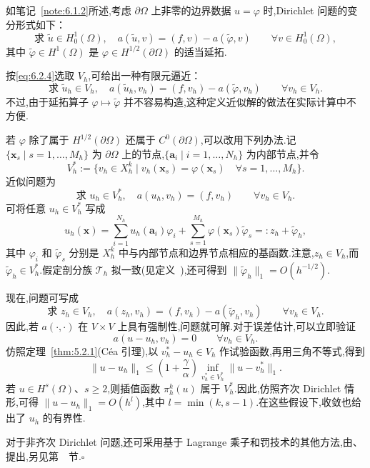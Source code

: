 \begin{note}
如笔记~\ref{note:6.1.2}所述,考虑 \(\partial\Omega\) 上非零的边界数据 \(u=\varphi\) 时,Dirichlet 问题的变分形式如下：
\[
  \text{求 }\widetilde u\in H_0^1(\Omega),\quad
  a(\widetilde u,v)=(f,v)-a(\widetilde\varphi,v)
  \qquad\forall v\in H_0^1(\Omega),
\]
其中 \(\widetilde\varphi\in H^1(\Omega)\) 是 \(\varphi\in H^{1/2}(\partial\Omega)\) 的适当延拓.

按\eqref{eq:6.2.4}选取 \(V_h\),可给出一种有限元逼近：
\[
  \text{求 }\widetilde u_h\in V_h,\quad
  a(\widetilde u_h,v_h)=(f,v_h)-a(\widetilde\varphi,v_h)\qquad\forall v_h\in V_h.
\]
不过,由于延拓算子 \(\varphi\mapsto\widetilde\varphi\) 并不容易构造,这种定义近似解的做法在实际计算中不方便.

若 \(\varphi\) 除了属于 \(H^{1/2}(\partial\Omega)\) 还属于 \(C^0(\partial\Omega)\),可以改用下列办法.记 \(\{\boldsymbol{x}_s\mid s=1,\ldots,M_h\}\) 为 \(\partial\Omega\) 上的节点,\(\{\boldsymbol{a}_i\mid i=1,\ldots,N_h\}\) 为内部节点,并令
\[
  V_h^*:=\{v_h\in X_h^k\mid v_h(\boldsymbol{x}_s)=\varphi(\boldsymbol{x}_s)
                        \quad\forall s=1,\ldots,M_h\}.
\]
近似问题为
\[
  \text{求 }u_h\in V_h^*,\quad a(u_h,v_h)=(f,v_h)\qquad\forall v_h\in V_h.
\]
可将任意 \(u_h\in V_h^*\) 写成
\[
  u_h(\boldsymbol{x})
    =\sum_{i=1}^{N_h}u_h(\boldsymbol{a}_i)\varphi_i
     +\sum_{s=1}^{M_h}\varphi(\boldsymbol{x}_s)\widetilde\varphi_s
    =:z_h+\widetilde\varphi_h,
\]
其中 \(\varphi_i\) 和 \(\widetilde\varphi_s\) 分别是 \(X_h^k\) 中与内部节点和边界节点相应的基函数.注意,\(z_h\in V_h\),而 \(\widetilde\varphi_h\in V_h^*\).假定剖分族 \(\mathcal T_h\) 拟一致(见定义~),还可得到 \(\|\widetilde\varphi_h\|_1=O(h^{-1/2})\).

现在,问题可写成
\[
  \text{求 }z_h\in V_h,\quad
  a(z_h,v_h)=(f,v_h)-a(\widetilde\varphi_h,v_h)\qquad\forall v_h\in V_h.
\]
因此,若 \(a(\cdot,\cdot)\) 在 \(V\times V\) 上具有强制性,问题就可解.对于误差估计,可以立即验证
\[
  a(u-u_h,v_h)=0\qquad\forall v_h\in V_h.
\]
仿照定理~\ref{thm:5.2.1}(Céa 引理),以 \(v_h^*-u_h\in V_h\) 作试验函数,再用三角不等式,得到
\[
  \|u-u_h\|_1\le
  \left(1+\frac\gamma\alpha\right)\inf_{v_h^*\in V_h^*}\|u-v_h^*\|_1.
\]
若 \(u\in H^s(\Omega)\)、\(s\ge2\),则插值函数 \(\pi_h^k(u)\) 属于 \(V_h^*\).因此,仿照齐次 Dirichlet 情形,可得 \(\|u-u_h\|_1=O(h^l)\),其中 \(l=\min(k,s-1)\).在这些假设下,收敛也给出了 \(u_h\) 的有界性.

对于非齐次 Dirichlet 问题,还可采用基于 Lagrange 乘子和罚技术的其他方法,由、提出,另见第~~节.\hfill\(\square\)
\end{note}


